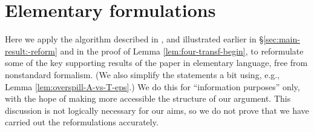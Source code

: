 \documentclass[reqno]{amsart}
\theoremstyle{plain} \newtheorem{theorem} {Theorem}
\theoremstyle{definition} \newtheorem{definition} [theorem] {Definition}
\theoremstyle{itplain} %
\numberwithin{equation}{section}
\numberwithin{theorem}{section}
\begin{document}
\appendix
\section{Elementary formulations}\label{sec:elem-form}

Here we apply the algorithm described in \cite[\S2]{MR469763}, and illustrated earlier in \S\ref{sec:main-result:-reform} and in the proof of Lemma \ref{lem:four-transf-begin}, to reformulate some of the key supporting results of the paper in elementary language, free from nonstandard formalism.  (We also simplify the statements a bit using, e.g., Lemma \ref{lem:overspill-A-vs-T-eps}.)  We do this for ``information purposes'' only, with the hope of making more accessible the structure of our argument.  This discussion is not logically necessary for our aims, so we do not prove that we have carried out the reformulations accurately.
\end{document}
